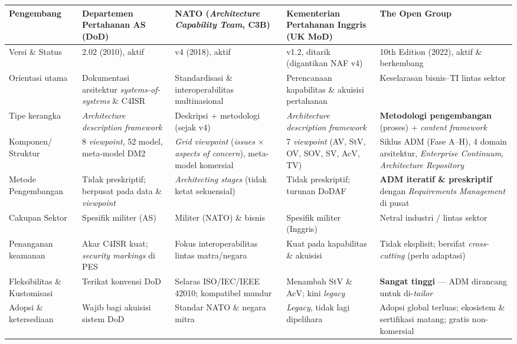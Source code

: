{\begin{longtable}{|p{2.1cm}|p{2.5cm}|p{2.5cm}|p{2.5cm}|p{2.5cm}|}
Pengembang & Departemen Pertahanan AS (DoD) & NATO (\textit{Architecture Capability Team}, C3B) & Kementerian Pertahanan Inggris (UK MoD) & The Open Group \\
\hline
Versi \& Status & 2.02 (2010), aktif & v4 (2018), aktif & v1.2, ditarik (digantikan NAF v4) & 10th Edition (2022), aktif \& berkembang \\
\hline
Orientasi utama & Dokumentasi arsitektur \textit{systems-of-systems} \& C4ISR & Standardisasi \& interoperabilitas multinasional & Perencanaan kapabilitas \& akuisisi pertahanan & Keselarasan bisnis--TI lintas sektor \\
\hline
Tipe kerangka & \textit{Architecture description framework} & Deskripsi + metodologi (sejak v4) & \textit{Architecture description framework} & \textbf{Metodologi pengembangan} (proses) + \textit{content framework} \\
\hline
Komponen/ Struktur & 8 \textit{viewpoint}, 52 model, meta-model DM2 & \textit{Grid viewpoint} (\textit{issues} $\times$ \textit{aspects of concern}), meta-model komersial & 7 \textit{viewpoint} (AV, StV, OV, SOV, SV, AcV, TV) & Siklus ADM (Fase A--H), 4 domain arsitektur, \textit{Enterprise Continuum}, \textit{Architecture Repository} \\
\hline
Metode Pengembangan & Tidak preskriptif; berpusat pada data \& \textit{viewpoint} & \textit{Architecting stages} (tidak ketat sekuensial) & Tidak preskriptif; turunan DoDAF & \textbf{ADM iteratif \& preskriptif} dengan \textit{Requirements Management} di pusat \\
\hline
Cakupan Sektor & Spesifik militer (AS) & Militer (NATO) \& bisnis & Spesifik militer (Inggris) & Netral industri / lintas sektor \\
\hline
Penanganan keamanan & Akar C4ISR kuat; \textit{security markings} di PES & Fokus interoperabilitas lintas matra/negara & Kuat pada kapabilitas \& akuisisi & Tidak eksplisit; bersifat \textit{cross-cutting} (perlu adaptasi) \\
\hline
Fleksibilitas \& Kustomisasi & Terikat konvensi DoD & Selaras ISO/IEC/IEEE 42010; kompatibel mundur & Menambah StV \& AcV; kini \textit{legacy} & \textbf{Sangat tinggi} --- ADM dirancang untuk di-\textit{tailor} \\
\hline
Adopsi \& ketersediaan & Wajib bagi akuisisi sistem DoD & Standar NATO \& negara mitra & \textit{Legacy}, tidak lagi dipelihara & Adopsi global terluas; ekosistem \& sertifikasi matang; gratis non-komersial \\
\hline
\end{longtable}
}

